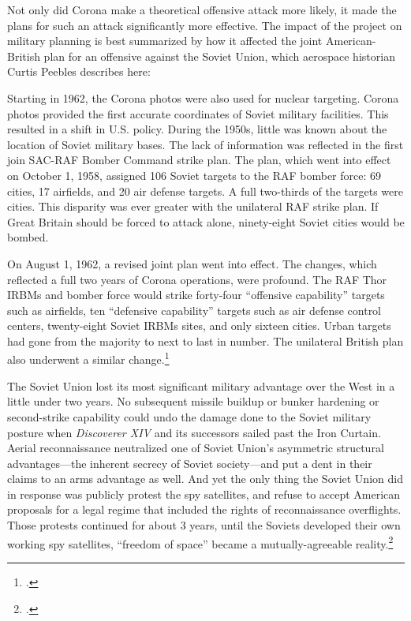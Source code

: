 \documentclass[14pt]{extarticle}
\begin{document}
Not only did Corona make a theoretical offensive attack more likely, it made the plans for such an attack significantly more effective. The impact of the project on military planning is best summarized by how it affected the joint American-British plan for an offensive against the Soviet Union, which aerospace historian Curtis Peebles describes here:

\begin{quoteblock}
Starting in 1962, the Corona photos were also used for nuclear targeting. Corona photos provided the first accurate coordinates of Soviet military facilities. This resulted in a shift in U.S. policy. During the 1950s, little was known about the location of Soviet military bases. The lack of information was reflected in the first join SAC-RAF Bomber Command strike plan. The plan, which went into effect on October 1, 1958, assigned 106 Soviet targets to the RAF bomber force: 69 cities, 17 airfields, and 20 air defense targets. A full two-thirds of the targets were cities. This disparity was ever greater with the unilateral RAF strike plan. If Great Britain should be forced to attack alone, ninety-eight Soviet cities would be bombed.

On August 1, 1962, a revised joint plan went into effect. The changes, which reflected a full two years of Corona operations, were profound. The RAF Thor IRBMs and bomber force would strike forty-four ``offensive capability'' targets such as airfields, ten ``defensive capability'' targets such as air defense control centers, twenty-eight Soviet IRBMs sites, and only sixteen cities. Urban targets had gone from the majority to next to last in number. The unilateral British plan also underwent a similar change.\footcite[p.~139]{peebles_corona_1997}
\end{quoteblock}

The Soviet Union lost its most significant military advantage over the West in a little under two years. No subsequent missile buildup or bunker hardening or second-strike capability could undo the damage done to the Soviet military posture when \emph{Discoverer XIV} and its successors sailed past the Iron Curtain. Aerial reconnaissance neutralized one of Soviet Union's asymmetric structural advantages---the inherent secrecy of Soviet society---and put a dent in their claims to an arms advantage as well. And yet the only thing the Soviet Union did in response was publicly protest the spy satellites, and refuse to accept American proposals for a legal regime that included the rights of reconnaissance overflights. Those protests continued for about 3 years, until the Soviets developed their own working spy satellites, ``freedom of space'' became a mutually-agreeable reality.\footcite[p.~271-275]{mcdougall_heavens_1985}
\end{document}
